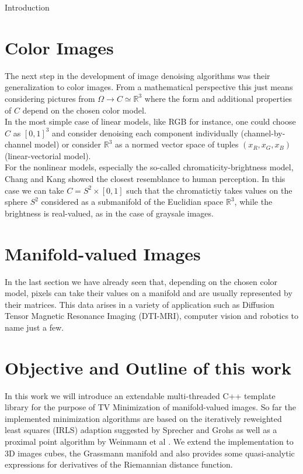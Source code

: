 \begin{chapter}{Introduction}


\section{Color Images}
The next step in the development of image denoising algorithms was their generalization to color images. From a mathematical perspective this just means considering pictures
from $\Omega\to C\simeq \mathbb{R}^3$ where the form and additional properties of $C$ depend on the chosen color model. \\
In the most simple case of linear models, like RGB for instance, one could choose $C$ as $[0,1]^3$ and consider denoising each component individually (channel-by-channel model)
or consider $\mathbb{R}^3$ as a normed vector space of tuples $(x_R, x_G, x_B)$ (linear-vectorial model).\\
For the nonlinear models, especially the so-called chromaticity-brightness model, Chang and Kang \cite{Kang} showed the closest resemblance to human perception.
In this case we can take $C=S^2\times [0,1]$ such that the chromatictiy takes values on the sphere $S^2$ considered as a submanifold of the Euclidian space $\mathbb{R}^3$, 
while the brightness is real-valued, as in the case of graysale images.

\section{Manifold-valued Images} %
\label{sec:Manifold-valued Images}
In the last section we have already seen that, depending on the chosen color model, pixels can take their values on a manifold and are usually represented by their matrices.
This data arises in a variety of application such as Diffusion Tensor Magnetic Resonance Imaging (DTI-MRI), computer vision and robotics to name just a few.

\section{Objective and Outline of this work}
In this work we will introduce an extendable multi-threaded C++ template library for the purpose of TV Minimization of manifold-valued images. 
So far the implemented minimization algorithms are based on the iteratively reweighted least squares (IRLS) adaption suggested by Sprecher and Grohs \cite{Grohssprecher} as well as a 
proximal point algorithm by Weinmann et al \cite{Weinmann}. We extend the implementation to 3D images cubes, the Grassmann manifold and also provides some quasi-analytic expressions
for derivatives of the Riemannian distance function.\\


\end{chapter}
